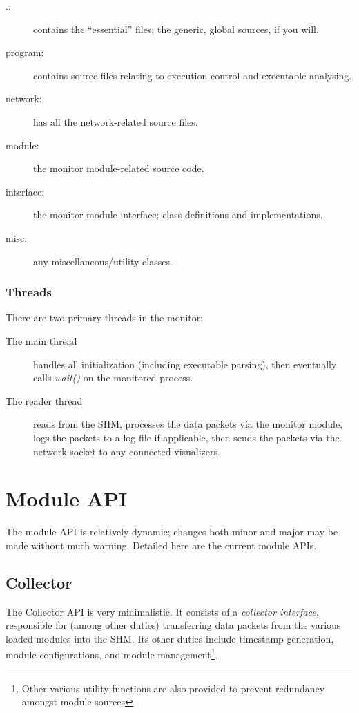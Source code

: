 \documentclass[a4paper,10pt]{report}
\begin{document}
\begin{description}
 \item[.:] contains the ``essential'' files; the generic, global sources, if you will.
 \item[program:] contains source files relating to execution control and executable analysing.
 \item[network:] has all the network-related source files.
 \item[module:] the monitor module-related source code.
 \item[interface:] the monitor module interface; class definitions and implementations.
 \item[misc:] any miscellaneous/utility classes.
\end{description}

\subsection{Threads}

There are two primary threads in the monitor:
\begin{description}
 \item[\textnormal{The} main thread] handles all initialization (including executable parsing), then eventually calls \emph{wait()} on
  the monitored process.
 \item[\textnormal{The} reader thread] reads from the SHM, processes the data packets via the monitor module, logs the packets to a log
  file if applicable, then sends the packets via the network socket to any connected visualizers.
\end{description}

\chapter{Module API}
The module API is relatively dynamic; changes both minor and major may be made without much warning. Detailed here are the
current module APIs.
\section{Collector}
The Collector API is very minimalistic. It consists of a \emph{collector interface}, responsible for (among other duties)
transferring data packets from the various loaded modules into the SHM. Its other duties include timestamp generation,
module configurations, and module management\footnote{Other various utility functions are also provided to prevent
redundancy amongst module sources}.
\end{document}
